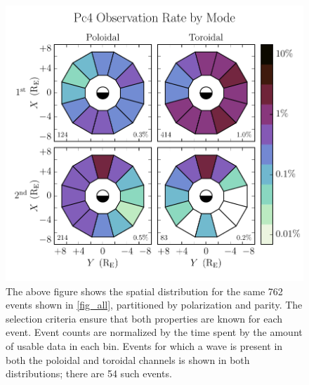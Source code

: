 \documentclass{article}
\begin{document}
\begin{figure}
    \begin{center}
    \includegraphics[width=\textwidth]{figures/fig_mode.pdf}
    \caption{
        The above figure shows the spatial distribution for the same 762 events shown in \cref{fig_all}, partitioned by polarization and parity. The selection criteria ensure that both properties are known for each event. Event counts are normalized by the time spent by the amount of usable data in each bin. Events for which a wave is present in both the poloidal and toroidal channels is shown in both distributions; there are 54 such events. 
    }
    \label{fig_mode}
    \end{center}
\end{figure}



\end{document}
